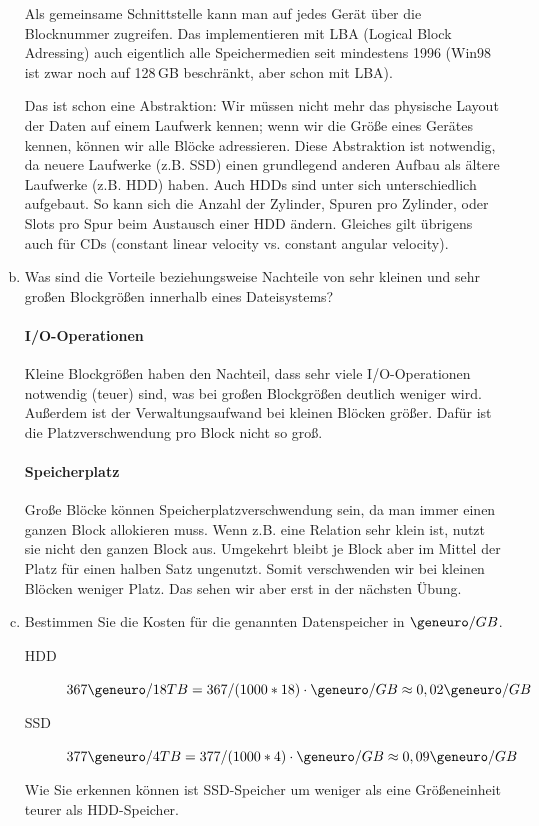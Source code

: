 \begin{enumerate}[a)]
	\begin{solution}
		Als gemeinsame Schnittstelle kann man auf jedes Gerät über die Blocknummer zugreifen.
		Das implementieren mit LBA (Logical Block Adressing) auch eigentlich alle Speichermedien seit mindestens 1996 (Win98 ist zwar noch auf 128\,GB beschränkt, aber schon mit LBA).

		Das ist schon eine Abstraktion: Wir müssen nicht mehr das physische Layout der Daten auf einem Laufwerk kennen; wenn wir die Größe eines Gerätes kennen, können wir alle Blöcke adressieren.
		Diese Abstraktion ist notwendig, da neuere Laufwerke (z.B. SSD) einen grundlegend anderen Aufbau als ältere Laufwerke (z.B. HDD) haben.
		Auch HDDs sind unter sich unterschiedlich aufgebaut.
		So kann sich die Anzahl der Zylinder, Spuren pro Zylinder, oder Slots pro Spur beim Austausch einer HDD ändern.
		Gleiches gilt übrigens auch für CDs (constant linear velocity vs. constant angular velocity).
	\end{solution}

	\item Was sind die Vorteile beziehungsweise Nachteile von sehr kleinen und sehr großen Blockgrößen innerhalb eines Dateisystems?

	\begin{solution}
		\paragraph{I/O-Operationen}
		Kleine Blockgrößen haben den Nachteil, dass sehr viele I/O-Operationen notwendig (teuer) sind, was bei großen Blockgrößen deutlich weniger wird.
		Außerdem ist der Verwaltungsaufwand bei kleinen Blöcken größer.
		Dafür ist die Platzverschwendung pro Block nicht so groß.

		\paragraph{Speicherplatz}
		Große Blöcke können Speicherplatzverschwendung sein, da man immer einen ganzen Block allokieren muss.
		Wenn z.B. eine Relation sehr klein ist, nutzt sie nicht den ganzen Block aus.
		Umgekehrt bleibt je Block aber im Mittel der Platz für einen halben Satz ungenutzt.
		Somit verschwenden wir bei kleinen Blöcken weniger Platz.
		Das sehen wir aber erst in der nächsten Übung.
	\end{solution}
	\item Bestimmen Sie die Kosten für die genannten Datenspeicher in $\geneuro/GB$.

	\begin{solution}
		\begin{description}
			\item[HDD] $367\geneuro / 18TB = 367 / (1000*18) \cdot \geneuro/GB \approx 0,02 \geneuro/GB$
			\item[SSD] $377\geneuro / 4TB = 377 /(1000*4) \cdot \geneuro/GB \approx 0,09 \geneuro/GB$
		\end{description}
		Wie Sie erkennen können ist SSD-Speicher um weniger als eine Größeneinheit teurer als HDD-Speicher.
	\end{solution}
\end{enumerate}
